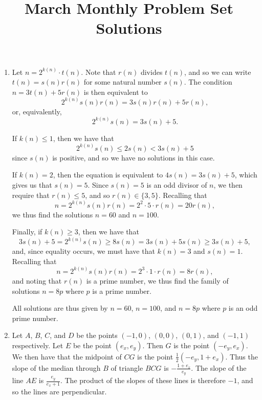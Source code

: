 \documentclass[12pt]{article}
\title{\vspace{-24pt}March Monthly Problem Set Solutions}
\author{\vspace{-24pt}}
\date{\vspace{-24pt}}
\begin{document}
 \maketitle \pagestyle{empty}

\begin{enumerate}

\item %
Let $n = 2^{k(n)} \cdot t(n)$. Note that $r(n)$ divides $t(n)$, and so we can
write $t(n) = s(n) r(n)$ for some natural number $s(n)$. The condition $n =
3t(n) + 5r(n)$ is then equivalent to
\[
    2^{k(n)} s(n) r(n) = 3 s(n) r(n) + 5r(n),
\]
or, equivalently,
\[
    2^{k(n)} s(n) = 3s(n) + 5.
\]

If $k(n) \leq 1$, then we have that
\[
    2^{k(n)} s(n) \leq 2s(n) < 3s(n) + 5
\]
since $s(n)$ is positive, and so we have no solutions in this case.

If $k(n) = 2$, then the equation is equivalent to $4s(n) = 3s(n) + 5$, which
gives us that $s(n) = 5$. Since $s(n) = 5$ is an odd divisor of $n$, we then
require that $r(n) \leq 5$, and so $r(n) \in \{3, 5\}$. Recalling that
\[
    n = 2^{k(n)} s(n) r(n) = 2^2 \cdot 5 \cdot r(n) = 20 r(n),
\]
we thus find the solutions $n = 60$ and $n = 100$.

Finally, if $k(n) \geq 3$, then we have that
\[
    3s(n) + 5 = 2^{k(n)} s(n) \geq 8 s(n) = 3s(n) + 5s(n) \geq 3s(n) + 5,
\]
and, since equality occurs, we must have that $k(n) = 3$ and $s(n) = 1$.
Recalling that
\[
    n = 2^{k(n)} s(n) r(n) = 2^3 \cdot 1 \cdot r(n) = 8r(n),
\]
and noting that $r(n)$ is a prime number, we thus find the family of solutions
$n = 8p$ where $p$ is a prime number.

All solutions are thus given by $n = 60$, $n = 100$, and $n = 8p$ where $p$ is
an odd prime number.


\item %
Let $A$, $B$, $C$, and $D$ be the points $(-1, 0)$, $(0, 0)$, $(0, 1)$, and
$(-1, 1)$ respectively. Let $E$ be the point $(e_x, e_y)$. Then $G$ is the 
point $(-e_y, e_x)$. We then  have that the midpoint of $CG$ is the point
$\frac{1}{2} (- e_y, 1 + e_x)$. Thus the slope of the median through $B$ of
triangle $BCG$ is $-\frac{1 + e_x}{e_y}$. The slope of the line $AE$ is
$\frac{e_y}{e_x + 1}$. The product of the slopes of these lines is therefore
$-1$, and so the lines are perpendicular.


\end{enumerate}
\end{document}
